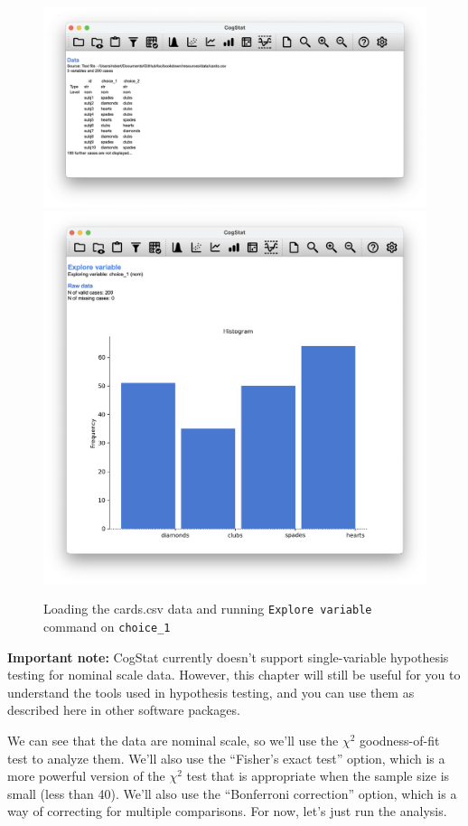\documentclass[
]{book}
\theoremstyle{definition}
\theoremstyle{definition}
\theoremstyle{definition}
\theoremstyle{definition}
\theoremstyle{remark}
\begin{document}
\begin{figure}

{\centering \includegraphics[width=0.66\linewidth]{resources/image/cogstatloadcards} \includegraphics[width=0.66\linewidth]{resources/image/cogstatcardsdescrhisto} 

}

\caption{Loading the cards.csv data and running \texttt{Explore\ variable} command on \texttt{choice\_1}}\label{fig:cogstatloadcards}
\end{figure}

\textbf{Important note:}
CogStat currently doesn't support single-variable hypothesis testing for nominal scale data. However, this chapter will still be useful for you to understand the tools used in hypothesis testing, and you can use them as described here in other software packages.

We can see that the data are nominal scale, so we'll use the \(\chi^2\) goodness-of-fit test to analyze them. We'll also use the ``Fisher's exact test'' option, which is a more powerful version of the \(\chi^2\) test that is appropriate when the sample size is small (less than 40). We'll also use the ``Bonferroni correction'' option, which is a way of correcting for multiple comparisons. For now, let's just run the analysis.
\end{document}
